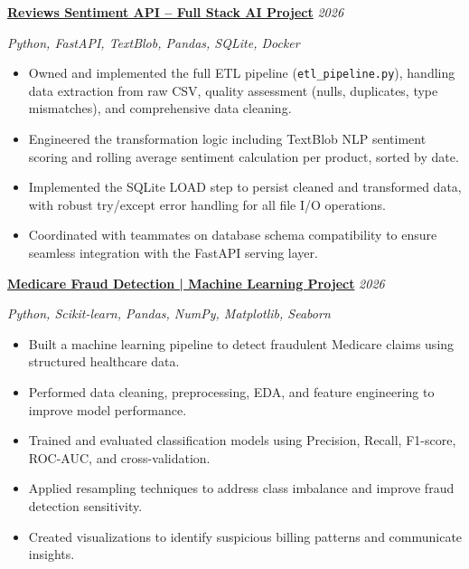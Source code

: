 \documentclass[a4paper,11pt]{article}
\newcommand{\cvproject}[2]{%
  \textbf{#1} \hfill \textit{#2}
  \vspace{2pt}
}
\begin{document}
\cvproject{\href{https://github.com/Seif-3mk-hassan/Sprints-capstone-project}{Reviews Sentiment API -- Full Stack AI Project}}{2026}
\newline \textit{Python, FastAPI, TextBlob, Pandas, SQLite, Docker} 
\begin{itemize}[leftmargin=1.5em, topsep=2pt, itemsep=-5pt]
  \item Owned and implemented the full ETL pipeline (\texttt{etl\_pipeline.py}), handling data extraction from raw CSV, quality assessment (nulls, duplicates, type mismatches), and comprehensive data cleaning.
  \item Engineered the transformation logic including TextBlob NLP sentiment scoring and rolling average sentiment calculation per product, sorted by date.
  \item Implemented the SQLite LOAD step to persist cleaned and transformed data, with robust try/except error handling for all file I/O operations.
  \item Coordinated with teammates on database schema compatibility to ensure seamless integration with the FastAPI serving layer.
\end{itemize}

\cvproject{\href{https://github.com/Khaled100233/medicare-fraud-detection}{Medicare Fraud Detection | Machine Learning Project}}{2026}
\newline \textit{Python, Scikit-learn, Pandas, NumPy, Matplotlib, Seaborn}
\begin{itemize}[leftmargin=1.5em, topsep=2pt, itemsep=-5pt]
  \item Built a machine learning pipeline to detect fraudulent Medicare claims using structured healthcare data.
  \item Performed data cleaning, preprocessing, EDA, and feature engineering to improve model performance.
  \item Trained and evaluated classification models using Precision, Recall, F1-score, ROC-AUC, and cross-validation.
  \item Applied resampling techniques to address class imbalance and improve fraud detection sensitivity.
  \item Created visualizations to identify suspicious billing patterns and communicate insights.
\end{itemize}

\vspace{6pt}
\end{document}
